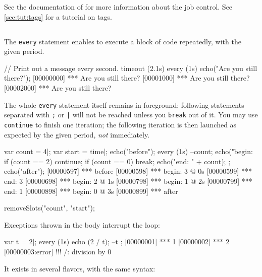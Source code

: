 See the documentation of  for more information about the job
control.  See \autoref{sec:tut:tags} for a tutorial on tags.

\subsection{}
\label{sec:lang:every}
The \lstinline{every} statement enables to execute a block of code
repeatedly, with the given period.

\begin{urbiscript}
// Print out a message every second.
timeout (2.1s)
  every (1s)
    echo("Are you still there?");
[00000000] *** Are you still there?
[00001000] *** Are you still there?
[00002000] *** Are you still there?
\end{urbiscript}

The whole \lstinline{every} statement itself remains in foreground:
following statements separated with \lstinline';' or \lstinline'|' will not
be reached unless you \lstinline{break} out of it.  You may use
\lstinline{continue} to finish one iteration; the following iteration is
then launched as expected by the given period, \emph{not} immediately.

\begin{urbiscript}
var count = 4|;
var start = time|;
echo("before");
every (1s)
{
  --count;
  echo("begin: %
  if (count == 2)
    continue;
  if (count == 0)
    break;
  echo("end:   " + count);
};
echo("after");
[00000597] *** before
[00000598] *** begin: 3 @ 0s
[00000599] *** end:   3
[00000698] *** begin: 2 @ 1s
[00000798] *** begin: 1 @ 2s
[00000799] *** end:   1
[00000898] *** begin: 0 @ 3s
[00000899] *** after
\end{urbiscript}
\begin{urbicomment}
removeSlots("count", "start");
\end{urbicomment}

Exceptions thrown in the body interrupt the loop:

\begin{urbiscript}
var t = 2|;
every (1s) { echo (2 / t); --t };
[00000001] *** 1
[00000002] *** 2
[00000003:error] !!! /: division by 0
\end{urbiscript}

It exists in several flavors, with the same syntax:

